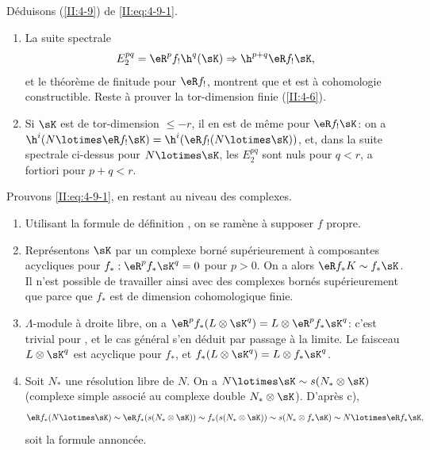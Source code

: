 Déduisons (\ref{II:4-9}) de \eqref{II:eq:4-9-1}. 
\begin{enumerate}[\indent a)]
  \item La suite spectrale 
    \[
      E_2^{p q} = \eR^p f_! \h^q(\sK) \Rightarrow \h^{p+q} \eR f_! \sK \text{,}
    \]
    et le théorème de finitude pour $\eR f_!$, montrent que 
     et est à cohomologie constructible. 
    Reste à prouver la tor-dimension finie (\ref{II:4-6}). 
  \item Si $\sK$ est de tor-dimension $\leqslant -r$, il en est de même pour 
    $\eR f_! \sK$: on a $\h^i(N\lotimes \eR f_! \sK) = \h^i(\eR f_!(N\lotimes \sK))$, 
    et, dans la suite spectrale ci-dessus pour $N\lotimes \sK$, les 
    $E_2^{p q}$ sont nuls pour $q<r$, a fortiori pour $p+q<r$. 
\end{enumerate}

Prouvons \eqref{II:eq:4-9-1}, en restant au niveau des complexes. 
\begin{enumerate}[\indent a)]
  \item Utilisant la formule de définition , on se 
    ramène à supposer $f$ propre. 
  \item {}Représentons $\sK$ par un complexe borné 
    supérieurement à composantes acycliques pour $f_*:\eR^p f_* \sK^q = 0$ 
    pour $p>0$. On a alors $\eR f_* K \sim f_* \sK$. Il n'est possible de 
    travailler ainsi avec des complexes bornés supérieurement que parce que 
    $f_*$ est de dimension cohomologique finie. 
  \item {} $\Lambda$-module à droite libre, on a 
    $\eR^p f_*(L\otimes \sK^q) = L\otimes \eR^p f_* \sK^q$: c'est trivial pour 
    , et le cas général s'en déduit par 
    passage à la limite. Le faisceau $L\otimes \sK^q$ est acyclique pour 
    $f_*$, et $f_*(L\otimes \sK^q) = L\otimes f_* \sK^q$. 
  \item Soit $N_*$ une résolution libre de $N$. On a 
    $N\lotimes \sK\sim s(N_*\otimes \sK)$ (complexe simple associé au 
    complexe double $N_*\otimes \sK$). D'après c), 
    \[
      \eR f_*(N\lotimes \sK) \sim \eR f_* (s(N_*\otimes \sK)) \sim f_*(s(N_*\otimes \sK)) \sim s(N_*\otimes f_* \sK) \sim N\lotimes \eR f_* \sK \text{,}
    \]
    soit la formule annoncée. 
\end{enumerate}


